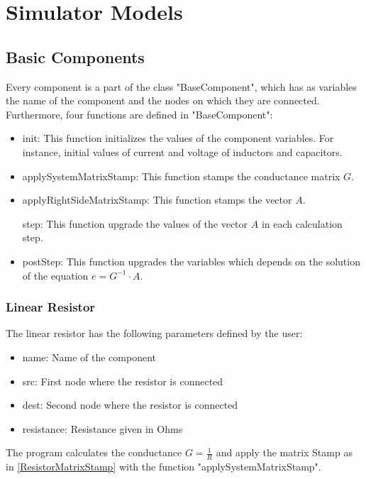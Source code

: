 \chapter{Simulator Models}

\section{Basic Components}

Every component is a part of the class "BaseComponent", which has as variables the name of the component and the nodes on which they are connected. Furthermore, four functions are defined in "BaseComponent":

\begin{itemize}
\item init: This function initializes the values of the component variables. For  instance, initial values of current and voltage of inductors and capacitors.

\item applySystemMatrixStamp: This function stamps the conductance matrix $G$.

\item applyRightSideMatrixStamp: This function stamps the vector $A$.

step: This function upgrade the values of the vector $A$ in each calculation step.

\item postStep: This function upgrades the variables which depends on the solution of the equation $e=G^{-1} \cdot A$.
\end{itemize}

\subsection{Linear Resistor}
The linear resistor has the following parameters defined by the user:
\begin{itemize}
\item name: Name of the component
\item src: First node where the resistor is connected
\item dest: Second node where the resistor is connected
\item resistance: Resistance given in Ohms
\end{itemize}
The program calculates the conductance $G = \frac{1}{R}$ and apply the matrix Stamp as in \ref{ResistorMatrixStamp} with the function "applySystemMatrixStamp".


